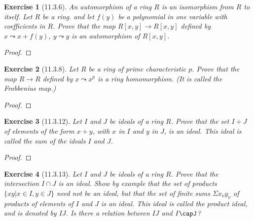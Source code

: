 \documentclass[12pt]{article}
\newtheorem*{exer}{Exercise}
\begin{document}
\begin{exer}[11.3.6]

    An \textit{automorphism} of a ring $R$ is an isomorphism from $R$ to
    itself. Let $R$ be a ring. and let $f(y)$ be a polynomial in one
    variable with coefficients in $R$. Prove that the map $R[x, y]
    \rightarrow R[x, y]$ defined by $x \leadsto x + f(y)$, $y \leadsto
    y$ is an automorphism of $R[x, y]$.

\end{exer}

\begin{proof}
\end{proof}


\begin{exer}[11.3.8]

    Let $R$ be a ring of prime characteristic $p$. Prove that the map $R
    \rightarrow R$ defined by $x \leadsto x^p$ is a ring homomorphism.
    (It is called the \textit{Frobbenius map}.)

\end{exer}

\begin{proof}
\end{proof}


\begin{exer}[11.3.12]

    Let $I$ and $J$ be ideals of a ring $R$. Prove that the set $I + J$
    of elements of the form $x + y$, with $x$ in $I$ and $y$ in $J$, is
    an ideal. This ideal is called the \textit{sum} of the ideals $I$
    and $J$. 

\end{exer}

\begin{proof}
\end{proof}


\begin{exer}[11.3.13]

    Let $I$ and $J$ be ideals of a ring $R$. Prove that the intersection
    $I \cap J$ is an ideal. Show by example that the set of products
    $\{xy | x \in I, y \in J\}$ need not be an ideal, but that the set
    of finite sums $\Sigma x_\nu y_\nu$ of products of elements of $I$
    and $J$ is an ideal. This ideal is called the \textit{product
    ideal}, and is denoted by $IJ$. Is there a relation between $IJ$ and
    $I\capJ$?

\end{exer}
\end{document}
